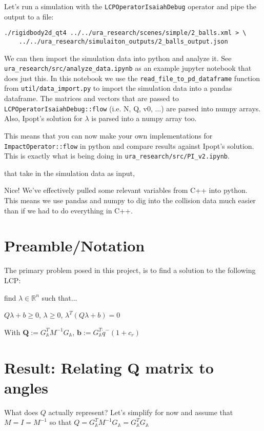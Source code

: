 \documentclass[12pt]{article}
\newcommand{\GA}{G_{\mathbb{A}}}
\begin{document}
Let's run a simulation with the \texttt{LCPOperatorIsaiahDebug} operator
and pipe the output to a file:

\begin{verbatim}
./rigidbody2d_qt4 ../../ura_research/scenes/simple/2_balls.xml > \
    ../../ura_research/simulaiton_outputs/2_balls_output.json
\end{verbatim}

We can then import the simulation data into python and analyze it.
See \texttt{ura\_research/src/analyze\_data.ipynb} as an example jupyter notebook that does just this.
In this notebook we use the \texttt{read\_file\_to\_pd\_dataframe} function from \texttt{util/data\_import.py}
to import the simulation data into a pandas dataframe.
The matrices and vectors that are passed to \texttt{LCPOperatorIsaiahDebug::flow} (i.e. N, Q, v0, ...)
are parsed into numpy arrays. Also, Ipopt's solution for $\lambda$ is parsed into a numpy array too.

This means that you can now make your own implementations for \texttt{ImpactOperator::flow} in python
and compare results against Ipopt's solution.
This is exactly what is being doing in \texttt{ura\_research/src/PI\_v2.ipynb}.

that take in the simulation data as input,

Nice! We've effectively pulled some relevant variables from C++ into python.
This means we use pandas and numpy to dig into the collision data much easier than if we had to do everything in C++.



\section{Preamble/Notation}

The primary problem posed in this project, is to find a solution to the following LCP:

find $\lambda \in \mathbb{R}^n$ such that...

$Q\lambda + b \geq 0$, $\lambda \geq 0$, $\lambda^T (Q\lambda + b) = 0$

With
$\mathbf{Q} := \GA^T M^{-1} \GA$,
$\mathbf{b} := \GA^T \dot{q}^- (1 + c_r)$


\section{Result: Relating Q matrix to angles}

What does $Q$ actually represent? Let's simplify for now and assume that $M = I = M^{-1}$
so that $Q = \GA^T M^{-1} \GA = \GA^T \GA$
\end{document}

